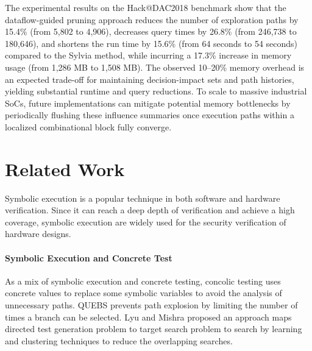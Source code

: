 \documentclass[conference]{IEEEtran}
\begin{document}
The experimental results on the Hack@DAC2018 benchmark show that the dataflow-guided pruning approach reduces the number of exploration
paths by 15.4\% (from 5,802 to 4,906), decreases query times by 26.8\% (from 246,738 to 180,646), and shortens the run time by 15.6\%
(from 64 seconds to 54 seconds) compared to the Sylvia method, while incurring a 17.3\% increase in memory usage (from 1,286 MB to 1,508 MB). 
The observed 10–20\% memory overhead is an expected trade-off for maintaining decision-impact sets and path histories, yielding substantial runtime and query reductions. To scale to massive industrial SoCs, future implementations can mitigate potential memory bottlenecks by periodically flushing these influence summaries once execution paths within a localized combinational block fully converge.
\vspace{-5pt}

\section{Related Work}
\label{sec:related_work}
Symbolic execution is a popular technique in both software and hardware verification. Since it can reach a deep depth of verification and achieve a high coverage, symbolic execution are widely used for the security verification of hardware designs.

\paragraph{Symbolic Execution and Concrete Test}
As a mix of symbolic execution and concrete testing, concolic testing uses concrete values to replace some symbolic variables to avoid the analysis of unnecessary paths. QUEBS\cite{concolic_1} prevents path explosion by limiting the number of times a branch can be selected. Lyu and Mishra \cite{concolic_3} proposed an approach maps directed test generation problem to target search problem to search by learning and clustering techniques to reduce the overlapping searches.%
\end{document}
